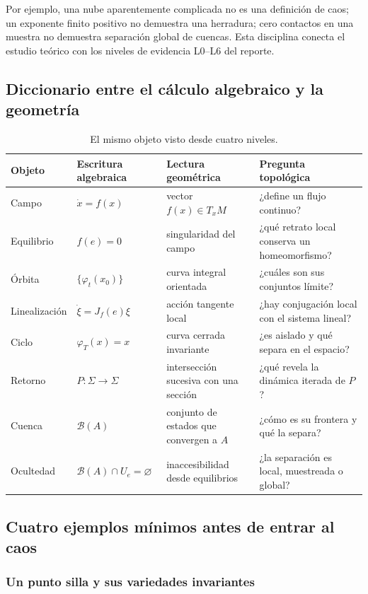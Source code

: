 Por ejemplo, una nube aparentemente complicada no es una definición de caos;
un exponente finito positivo no demuestra una herradura; cero contactos en
una muestra no demuestra separación global de cuencas. Esta disciplina conecta
el estudio teórico con los niveles de evidencia L0--L6 del reporte.

\subsection{Diccionario entre el cálculo algebraico y la geometría}

\begin{table}[H]
\centering
\caption{El mismo objeto visto desde cuatro niveles.}
\label{tab:diccionario-algebra-geometria}
\small
\begin{tabularx}{\textwidth}{@{}L{2.7cm}YYY@{}}
\toprule
Objeto & Escritura algebraica & Lectura geométrica & Pregunta topológica \\
\midrule
Campo & $\dot x=f(x)$ & vector $f(x)\in T_xM$ & ¿define un flujo continuo? \\
Equilibrio & $f(e)=0$ & singularidad del campo & ¿qué retrato local conserva un homeomorfismo? \\
Órbita & $\{\varphi_t(x_0)\}$ & curva integral orientada & ¿cuáles son sus conjuntos límite? \\
Linealización & $\dot\xi=J_f(e)\xi$ & acción tangente local & ¿hay conjugación local con el sistema lineal? \\
Ciclo & $\varphi_T(x)=x$ & curva cerrada invariante & ¿es aislado y qué separa en el espacio? \\
Retorno & $P:\Sigma\to\Sigma$ & intersección sucesiva con una sección & ¿qué revela la dinámica iterada de $P$? \\
Cuenca & $\mathcal B(A)$ & conjunto de estados que convergen a $A$ & ¿cómo es su frontera y qué la separa? \\
Ocultedad & $\mathcal B(A)\cap U_e=\varnothing$ & inaccesibilidad desde equilibrios & ¿la separación es local, muestreada o global? \\
\bottomrule
\end{tabularx}
\end{table}

\subsection{Cuatro ejemplos mínimos antes de entrar al caos}

\subsubsection{Un punto silla y sus variedades invariantes}

